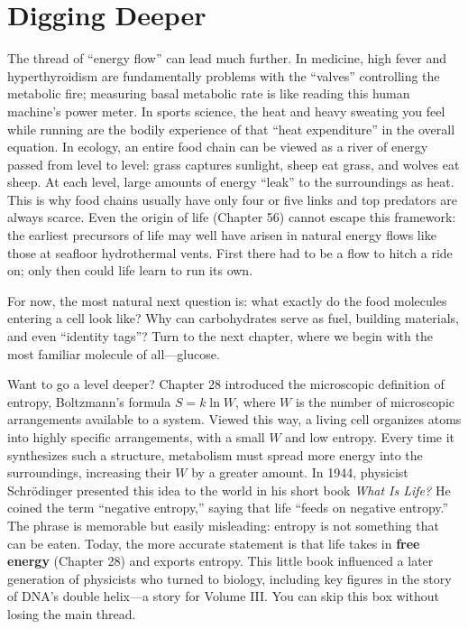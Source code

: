 \section{Digging Deeper}

The thread of ``energy flow'' can lead much further. In medicine, high fever and hyperthyroidism are fundamentally problems with the ``valves'' controlling the metabolic fire; measuring basal metabolic rate is like reading this human machine's power meter. In sports science, the heat and heavy sweating you feel while running are the bodily experience of that ``heat expenditure'' in the overall equation. In ecology, an entire food chain can be viewed as a river of energy passed from level to level: grass captures sunlight, sheep eat grass, and wolves eat sheep. At each level, large amounts of energy ``leak'' to the surroundings as heat. This is why food chains usually have only four or five links and top predators are always scarce. Even the origin of life (Chapter 56) cannot escape this framework: the earliest precursors of life may well have arisen in natural energy flows like those at seafloor hydrothermal vents. First there had to be a flow to hitch a ride on; only then could life learn to run its own.

For now, the most natural next question is: what exactly do the food molecules entering a cell look like? Why can carbohydrates serve as fuel, building materials, and even ``identity tags''? Turn to the next chapter, where we begin with the most familiar molecule of all---glucose.

\begin{tiaozhan}
Want to go a level deeper? Chapter 28 introduced the microscopic definition of entropy, Boltzmann's formula $S = k\ln W$, where $W$ is the number of microscopic arrangements available to a system. Viewed this way, a living cell organizes atoms into highly specific arrangements, with a small $W$ and low entropy. Every time it synthesizes such a structure, metabolism must spread more energy into the surroundings, increasing their $W$ by a greater amount. In 1944, physicist Schrödinger presented this idea to the world in his short book \textit{What Is Life?} He coined the term ``negative entropy,'' saying that life ``feeds on negative entropy.'' The phrase is memorable but easily misleading: entropy is not something that can be eaten. Today, the more accurate statement is that life takes in \textbf{free energy} (Chapter 28) and exports entropy. This little book influenced a later generation of physicists who turned to biology, including key figures in the story of DNA's double helix---a story for Volume III. You can skip this box without losing the main thread.
\end{tiaozhan}

